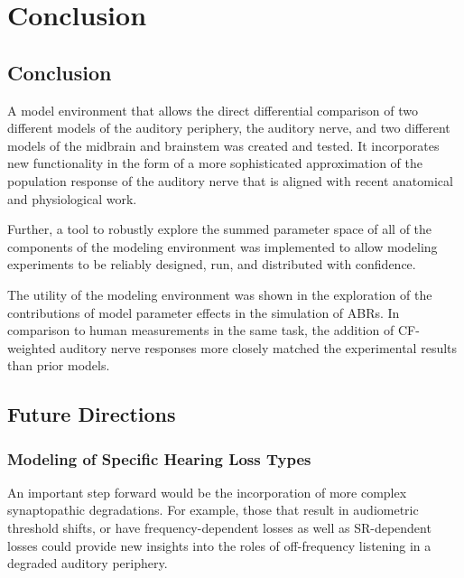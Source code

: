 \chapter{Conclusion}
\label{chapter:Conclusion}
\thispagestyle{myheadings}

\graphicspath{{7_Conclusion/Figures/}}

\section{Conclusion} %
\label{sec:conclusion}
A model environment that allows the direct differential comparison of two different models of the auditory periphery, the auditory nerve, and two different models of the midbrain and brainstem was created and tested.  It incorporates new functionality in the form of a more sophisticated approximation of the population response of the auditory nerve that is aligned with recent anatomical and physiological work.  

Further, a tool to robustly explore the summed parameter space of all of the components of the modeling environment was implemented to allow modeling experiments to be reliably designed, run, and distributed with confidence. 

The utility of the modeling environment was shown in the exploration of the contributions of model parameter effects in the simulation of ABRs.  In comparison to human measurements in the same task, the addition of CF-weighted auditory nerve responses more closely matched the experimental results than prior models.

\section{Future Directions} %
\label{sec:future_directions}
\subsection{Modeling of Specific Hearing Loss Types} %
\label{sub:modeling_of_specific_hearing_loss_types}
An important step forward would be the incorporation of more complex synaptopathic degradations.  For example, those that result in audiometric threshold shifts, or have frequency-dependent losses as well as SR-dependent losses could provide new insights into the roles of off-frequency listening in a degraded auditory periphery.  

